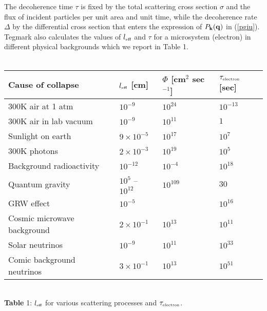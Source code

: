 \documentclass[12pt]{article}
\begin{document}
The decoherence time $\tau$ is fixed by the total scattering cross
section $\sigma$ and the flux of incident particles per unit area
and unit time, while the decoherence rate $\Delta$ by the
differential cross section that enters the expression of $P_{\bf
k}({\bf q})$ in (\ref{pgiu}). Tegmark also calculates the values
of $l_{\makebox{\tiny eff}}$ and $\tau$ for a microsystem
(electron) in different physical backgrounds which we report in Table 1.
\\ \\ \begin{center}
\begin{tabular}{||l|lll||} \hline
Cause of collapse & $l_{\makebox{\tiny eff}}$ [cm] & $\Phi$
[cm${}^{2}$ sec${}^{-1}$] & $\tau_{\makebox{\tiny electron}}$
[sec]
\\ \hline
300K air at 1 atm  & $10^{-9}$ & $10^{24}$ & $10^{-13}$ \\
300K air in lab vacuum  & $10^{-9}$ & $10^{11}$ & $1$ \\
Sunlight on earth  & $9\times 10^{-5}$ & $10^{17}$ & $10^{7}$ \\
300K photons  & $2\times 10^{-3}$ & $10^{19}$ & $10^{5}$ \\
Background radioactivity  & $10^{-12}$ & $10^{-4}$ & $10^{18}$ \\
Quantum gravity  & $10^{5}$ -- $10^{12}$ & $10^{109}$ & $30$ \\
\hline
GRW effect  & $10^{-5}$ &   & $10^{16}$ \\
\hline Cosmic microwave background  & $2\times 10^{-1}$ &
$10^{13}$ &
$10^{11}$ \\
Solar neutrinos & $10^{-9}$ & $10^{11}$ & $10^{33}$ \\
Comic background neutrinos  & $3\times 10^{-1}$ & $10^{13}$ &
$10^{51}$ \\ \hline
\end{tabular}
\\ \vspace{.3cm}
{\small {\bf Table} 1: $l_{\makebox{\tiny eff}}$ for various
scattering processes and $\tau_{\makebox{\tiny electron}}$.}
\end{center}
\end{document}
